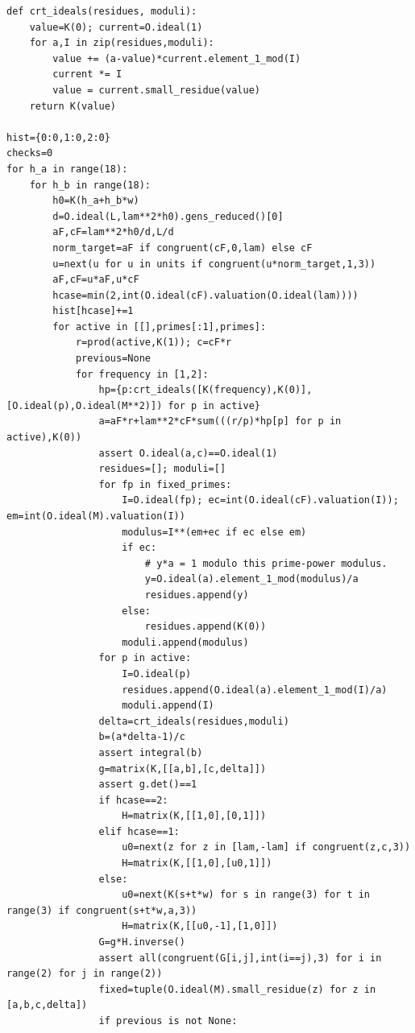 \documentclass[12pt]{article}
\begin{document}
\begin{verbatim}
def crt_ideals(residues, moduli):
    value=K(0); current=O.ideal(1)
    for a,I in zip(residues,moduli):
        value += (a-value)*current.element_1_mod(I)
        current *= I
        value = current.small_residue(value)
    return K(value)

hist={0:0,1:0,2:0}
checks=0
for h_a in range(18):
    for h_b in range(18):
        h0=K(h_a+h_b*w)
        d=O.ideal(L,lam**2*h0).gens_reduced()[0]
        aF,cF=lam**2*h0/d,L/d
        norm_target=aF if congruent(cF,0,lam) else cF
        u=next(u for u in units if congruent(u*norm_target,1,3))
        aF,cF=u*aF,u*cF
        hcase=min(2,int(O.ideal(cF).valuation(O.ideal(lam))))
        hist[hcase]+=1
        for active in [[],primes[:1],primes]:
            r=prod(active,K(1)); c=cF*r
            previous=None
            for frequency in [1,2]:
                hp={p:crt_ideals([K(frequency),K(0)],[O.ideal(p),O.ideal(M**2)]) for p in active}
                a=aF*r+lam**2*cF*sum(((r/p)*hp[p] for p in active),K(0))
                assert O.ideal(a,c)==O.ideal(1)
                residues=[]; moduli=[]
                for fp in fixed_primes:
                    I=O.ideal(fp); ec=int(O.ideal(cF).valuation(I)); em=int(O.ideal(M).valuation(I))
                    modulus=I**(em+ec if ec else em)
                    if ec:
                        # y*a = 1 modulo this prime-power modulus.
                        y=O.ideal(a).element_1_mod(modulus)/a
                        residues.append(y)
                    else:
                        residues.append(K(0))
                    moduli.append(modulus)
                for p in active:
                    I=O.ideal(p)
                    residues.append(O.ideal(a).element_1_mod(I)/a)
                    moduli.append(I)
                delta=crt_ideals(residues,moduli)
                b=(a*delta-1)/c
                assert integral(b)
                g=matrix(K,[[a,b],[c,delta]])
                assert g.det()==1
                if hcase==2:
                    H=matrix(K,[[1,0],[0,1]])
                elif hcase==1:
                    u0=next(z for z in [lam,-lam] if congruent(z,c,3))
                    H=matrix(K,[[1,0],[u0,1]])
                else:
                    u0=next(K(s+t*w) for s in range(3) for t in range(3) if congruent(s+t*w,a,3))
                    H=matrix(K,[[u0,-1],[1,0]])
                G=g*H.inverse()
                assert all(congruent(G[i,j],int(i==j),3) for i in range(2) for j in range(2))
                fixed=tuple(O.ideal(M).small_residue(z) for z in [a,b,c,delta])
                if previous is not None:

\end{verbatim}
\end{document}
